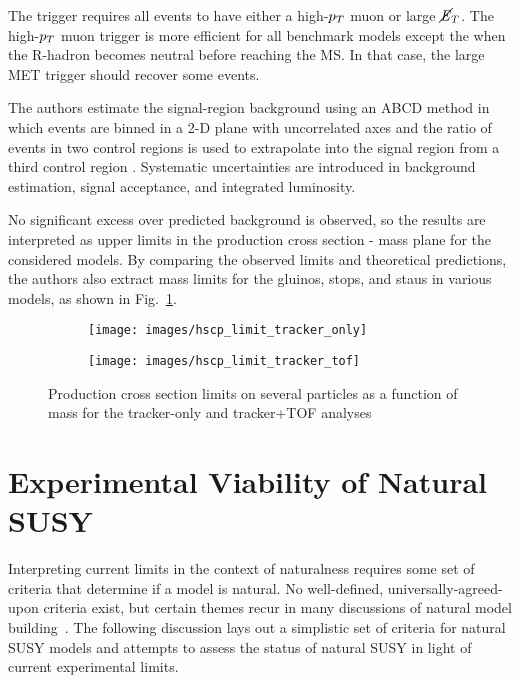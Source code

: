 \documentclass[12pt]{article}
\begin{document}
        The trigger requires all events to have either a high-$p_T$ muon or large $\cancel{\it{E}}_{T}$. The high-$p_T$ muon trigger is more efficient for all benchmark models except the when the R-hadron becomes neutral before reaching the MS. In that case, the large MET trigger should recover some events.

        The authors estimate the signal-region background using an ABCD method in which events are binned in a 2-D plane with uncorrelated axes and the ratio of events in two control regions is used to extrapolate into the signal region from a third control region . Systematic uncertainties are introduced in background estimation, signal acceptance, and integrated luminosity.

        No significant excess over predicted background is observed, so the results are interpreted as upper limits in the production cross section - mass plane for the considered models. By comparing the observed limits and theoretical predictions, the authors also extract mass limits for the gluinos, stops, and staus in various models, as shown in Fig.~\ref{hscp_limits}.

        \noindent \begin{figure}[htbp] \begin{center}
        \begin{subfigure}[htbp]{0.4\textwidth} \begin{center}
        \texttt{[image: images/hscp\_limit\_tracker\_only]}
        \end{center} \end{subfigure}
        \begin{subfigure}[htbp]{0.4\textwidth} \begin{center}
        \texttt{[image: images/hscp\_limit\_tracker\_tof]}
        \end{center} \end{subfigure}
        \caption{Production cross section limits on several particles as a function of mass for the tracker-only and tracker+TOF analyses~\cite{cms_hscp}}
        \label{hscp_limits}
        \end{center} \end{figure}

\section{Experimental Viability of Natural SUSY}
    Interpreting current limits in the context of naturalness requires some set of criteria that determine if a model is natural. No well-defined, universally-agreed-upon criteria exist, but certain themes recur in many discussions of natural model building~\cite{craig, vestiges, evans_toward_full, feng, cornering, kim}. The following discussion lays out a simplistic set of criteria for natural SUSY models and attempts to assess the status of natural SUSY in light of current experimental limits.
    
\end{document}
